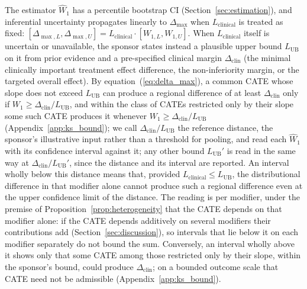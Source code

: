 \documentclass[AMA,Times1COL]{WileyNJDv5}
\begin{document}
The estimator $\widehat{W}_1$ has a percentile bootstrap CI (Section~\ref{sec:estimation}), and inferential uncertainty propagates linearly to $\Delta_{\max}$ when $L_{\text{clinical}}$ is treated as fixed: $[\Delta_{\max,L}, \Delta_{\max,U}] = L_{\text{clinical}} \cdot [W_{1,L}, W_{1,U}]$. When $L_{\text{clinical}}$ itself is uncertain or unavailable, the sponsor states instead a plausible upper bound $L_{\text{UB}}$ on it from prior evidence and a pre-specified clinical margin $\Delta_{\text{clin}}$ (the minimal clinically important treatment effect difference, the non-inferiority margin, or the targeted overall effect). By equation~(\ref{eq:delta_max}), a common CATE whose slope does not exceed $L_{\text{UB}}$ can produce a regional difference of at least $\Delta_{\text{clin}}$ only if $W_1 \geq \Delta_{\text{clin}} / L_{\text{UB}}$, and within the class of CATEs restricted only by their slope some such CATE produces it whenever $W_1 \geq \Delta_{\text{clin}} / L_{\text{UB}}$ (Appendix~\ref{app:ks_bound}); we call $\Delta_{\text{clin}} / L_{\text{UB}}$ the reference distance, the sponsor's illustrative input rather than a threshold for pooling, and read each $\widehat{W}_1$ with its confidence interval against it; any other bound $L_{\text{UB}}'$ is read in the same way at $\Delta_{\text{clin}} / L_{\text{UB}}'$, since the distance and its interval are reported. An interval wholly below this distance means that, provided $L_{\text{clinical}} \leq L_{\text{UB}}$, the distributional difference in that modifier alone cannot produce such a regional difference even at the upper confidence limit of the distance. The reading is per modifier, under the premise of Proposition~\ref{prop:heterogeneity} that the CATE depends on that modifier alone: if the CATE depends additively on several modifiers their contributions add (Section~\ref{sec:discussion}), so intervals that lie below it on each modifier separately do not bound the sum. Conversely, an interval wholly above it shows only that some CATE among those restricted only by their slope, within the sponsor's bound, could produce $\Delta_{\text{clin}}$; on a bounded outcome scale that CATE need not be admissible (Appendix~\ref{app:ks_bound}).
\end{document}
